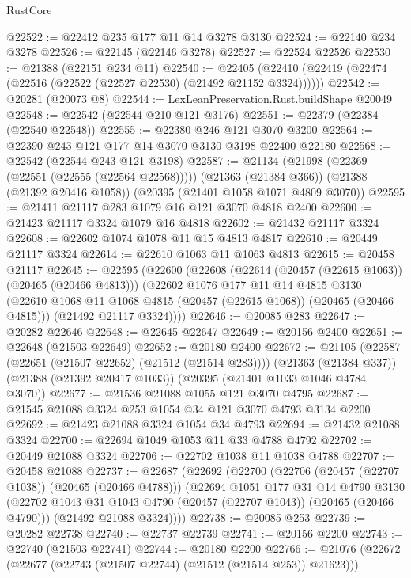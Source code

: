 \begin{lexlean}{RustCore}
\begin{coremodule}
@22522 := @22412 @235 @177 @11 @14 @3278 @3130
@22524 := @22140 @234 @3278
@22526 := @22145 (@22146 @3278)
@22527 := @22524 @22526
@22530 := @21388 (@22151 @234 @11)
@22540 := @22405 (@22410 (@22419 (@22474 (@22516 (@22522 (@22527 @22530) (@21492 @21152 @3324))))))
@22542 := @20281 (@20073 @8)
@22544 := LexLeanPreservation.Rust.buildShape @20049
@22548 := @22542 (@22544 @210 @121 @3176)
@22551 := @22379 (@22384 (@22540 @22548))
@22555 := @22380 @246 @121 @3070 @3200
@22564 := @22390 @243 @121 @177 @14 @3070 @3130 @3198 @22400 @22180
@22568 := @22542 (@22544 @243 @121 @3198)
@22587 := @21134
    (@21998 (@22369 (@22551 (@22555 (@22564 @22568)))))
    (@21363 (@21384 @366))
    (@21388 (@21392 @20416 @1058))
    (@20395 (@21401 @1058 @1071 @4809 @3070))
@22595 := @21411 @21117 @283 @1079 @16 @121 @3070 @4818 @2400
@22600 := @21423 @21117 @3324 @1079 @16 @4818
@22602 := @21432 @21117 @3324
@22608 := @22602 @1074 @1078 @11 @15 @4813 @4817
@22610 := @20449 @21117 @3324
@22614 := @22610 @1063 @11 @1063 @4813
@22615 := @20458 @21117
@22645 := @22595
    (@22600
      (@22608
        (@22614 (@20457 (@22615 @1063)) (@20465 (@20466 @4813)))
        (@22602
          @1076
          @177
          @11
          @14
          @4815
          @3130
          (@22610 @1068 @11 @1068 @4815 (@20457 (@22615 @1068)) (@20465 (@20466 @4815)))
          (@21492 @21117 @3324))))
@22646 := @20085 @283
@22647 := @20282 @22646
@22648 := @22645 @22647
@22649 := @20156 @2400
@22651 := @22648 (@21503 @22649)
@22652 := @20180 @2400
@22672 := @21105
    (@22587 (@22651 (@21507 @22652) (@21512 (@21514 @283))))
    (@21363 (@21384 @337))
    (@21388 (@21392 @20417 @1033))
    (@20395 (@21401 @1033 @1046 @4784 @3070))
@22677 := @21536 @21088 @1055 @121 @3070 @4795
@22687 := @21545 @21088 @3324 @253 @1054 @34 @121 @3070 @4793 @3134 @2200
@22692 := @21423 @21088 @3324 @1054 @34 @4793
@22694 := @21432 @21088 @3324
@22700 := @22694 @1049 @1053 @11 @33 @4788 @4792
@22702 := @20449 @21088 @3324
@22706 := @22702 @1038 @11 @1038 @4788
@22707 := @20458 @21088
@22737 := @22687
    (@22692
      (@22700
        (@22706 (@20457 (@22707 @1038)) (@20465 (@20466 @4788)))
        (@22694
          @1051
          @177
          @31
          @14
          @4790
          @3130
          (@22702 @1043 @31 @1043 @4790 (@20457 (@22707 @1043)) (@20465 (@20466 @4790)))
          (@21492 @21088 @3324))))
@22738 := @20085 @253
@22739 := @20282 @22738
@22740 := @22737 @22739
@22741 := @20156 @2200
@22743 := @22740 (@21503 @22741)
@22744 := @20180 @2200
@22766 := @21076
    (@22672 (@22677 (@22743 (@21507 @22744) (@21512 (@21514 @253)) @21623)))

\end{coremodule}
\end{lexlean}
